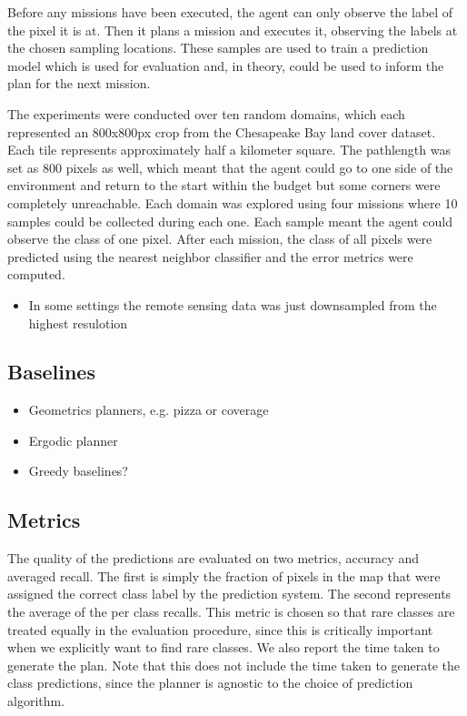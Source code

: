 Before any missions have been executed, the agent can only observe the label of the pixel it is at. Then it plans a mission and executes it, observing the labels at the chosen sampling locations. These samples are used to train a prediction model which is used for evaluation and, in theory, could be used to inform the plan for the next mission. 


The experiments were conducted over ten random domains, which each represented an 800x800px crop from the Chesapeake Bay land cover dataset. Each tile represents approximately half a kilometer square. The pathlength was set as 800 pixels as well, which meant that the agent could go to one side of the environment and return to the start within the budget but some corners were completely unreachable. Each domain was explored using four missions where 10 samples could be collected during each one. Each sample meant the agent could observe the class of one pixel. After each mission, the class of all pixels  were predicted using the nearest neighbor classifier and the error metrics were computed. 


\begin{itemize}
    \item In some settings the remote sensing data was just downsampled from the highest resulotion 
\end{itemize}

\subsection{Baselines}
\begin{itemize}
    \item Geometrics planners, e.g. pizza or coverage 
    \item Ergodic planner \cite{Rao}
    \item Greedy baselines?
\end{itemize}

\subsection{Metrics}
The quality of the predictions are evaluated on two metrics, accuracy and averaged recall. The first is simply the fraction of pixels in the map that were assigned the correct class label by the prediction system. The second represents the average of the per class recalls. This metric is chosen so that rare classes are treated equally in the evaluation procedure, since this is critically important when we explicitly want to find rare classes. We also report the time taken to generate the plan. Note that this does not include the time taken to generate the class predictions, since the planner is agnostic to the choice of prediction algorithm.



